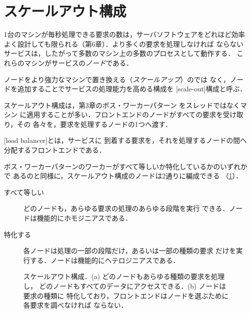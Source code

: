 \documentclass[../main.tex]{subfiles}
\begin{document}
\section{スケールアウト構成}
\label{sec:l16-scaleout}

1台のマシンが毎秒処理できる要求の数は，サーバソフトウェアをどれほど効率
よく設計しても限られる（第6章）．より多くの要求を処理しなければ
ならないサービスは，したがって多数のマシン上の多数のプロセスとして動作する．
これらのマシンがサービスの\emph{ノード}である．

\begin{definition}[スケールアウト]
  ノードをより強力なマシンで置き換える（\emph{スケールアップ}）のでは
  なく，ノードを追加することでサービスの処理能力を高める構成を
  [scale-out]構成と呼ぶ．
\end{definition}

スケールアウト構成は，第3章のボス・ワーカーパターン%
をスレッドではなくマシン
に適用することが多い．フロントエンドのノードがすべての要求を受け取り，その
各々を，要求を処理するノードの1つへ渡す．

\begin{definition}[ロードバランサ]
  [load balancer]とは，サービスに
  到着する要求を，それを処理するノードの間へ分配するフロントエンドである．%
\end{definition}

ボス・ワーカーパターンのワーカーがすべて等しいか特化しているかのいずれかで
あるのと同様に，スケールアウト構成のノードは2通りに編成できる
（\cref{fig:l16-scaleout}）．
\begin{description}
  \item[すべて等しい] どのノードも，あらゆる要求の処理のあらゆる段階を実行
    できる．ノードは機能的にホモジニアスである．
  \item[特化する] 各ノードは処理の一部の段階だけ，あるいは一部の種類の要求
    だけを実行する．ノードは機能的にヘテロジニアスである．
\end{description}

\begin{figure}[htbp]
  \centering
  
  \caption{スケールアウト構成．(a) どのノードもあらゆる種類の要求を処理し，
    どのノードもすべてのデータにアクセスできる．(b) ノードは要求の種類に
    特化しており，フロントエンドはノードを選ぶために各要求を調べなければ
    ならない．}
  \label{fig:l16-scaleout}
\end{figure}
\end{document}
